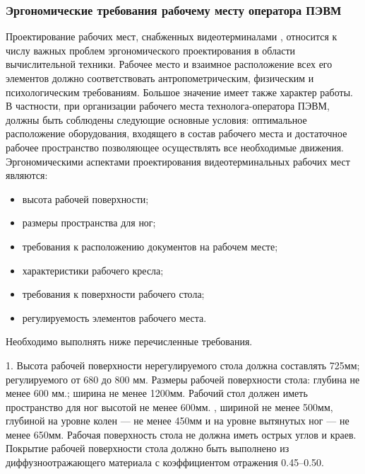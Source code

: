 \subsubsection{Эргономические требования рабочему месту оператора ПЭВМ}
Проектирование рабочих мест, снабженных видеотерминалами , относится к числу важных
проблем эргономического проектирования в области вычислительной техники. Рабочее место и
взаимное расположение всех его элементов должно соответствовать антропометрическим,
физическим и психологическим требованиям. Большое значение имеет также характер работы.
В частности, при организации рабочего места технолога-оператора ПЭВМ, должны быть соблюдены
следующие основные условия: оптимальное расположение оборудования, входящего в состав
рабочего места и достаточное рабочее пространство позволяющее осуществлять все необходимые
движения. Эргономическими аспектами проектирования видеотерминальных рабочих мест являются:
\begin{itemize}
	\item{} высота рабочей поверхности;
	\item{} размеры пространства для ног;
	\item{} требования к расположению документов
на рабочем месте;
	\item{} характеристики рабочего кресла;
	\item{} требования к поверхности рабочего стола;
	\item{} регулируемость элементов рабочего места.
\end{itemize}

Необходимо выполнять ниже перечисленные требования.


1. Высота рабочей поверхности нерегулируемого стола должна составлять  725мм;
регулируемого от 680 до 800 мм. Размеры рабочей поверхности стола: глубина
не менее  600 мм.; ширина не менее 1200мм. Рабочий стол должен иметь пространство для ног
высотой не  менее 600мм. , шириной не менее 500мм,  глубиной на уровне колен --- не менее 450мм
и на уровне вытянутых ног --- не менее 650мм. Рабочая поверхность стола не должна иметь острых
углов и краев. Покрытие рабочей поверхности стола должно быть выполнено из диффузноотражающего
материала с коэффициентом отражения 0.45--0.50.


